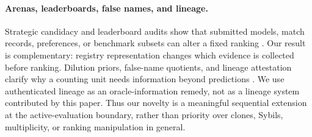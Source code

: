 \paragraph{Arenas, leaderboards, false names, and lineage.}
Strategic candidacy and leaderboard audits show that submitted models, match records, preferences, or benchmark subsets can alter a fixed ranking \citep{hays2026strategic,singh2025leaderboard,huang2026dropping,yauney2026microbenchmark}. Our result is complementary: registry representation changes which evidence is collected before ranking. Dilution priors, false-name quotients, and lineage attestation clarify why a counting unit needs information beyond predictions \citep{george2010dilution,burnat2026quotient,shang2026lineage}. We use authenticated lineage as an oracle-information remedy, not as a lineage system contributed by this paper. Thus our novelty is a meaningful sequential extension at the active-evaluation boundary, rather than priority over clones, Sybils, multiplicity, or ranking manipulation in general.

